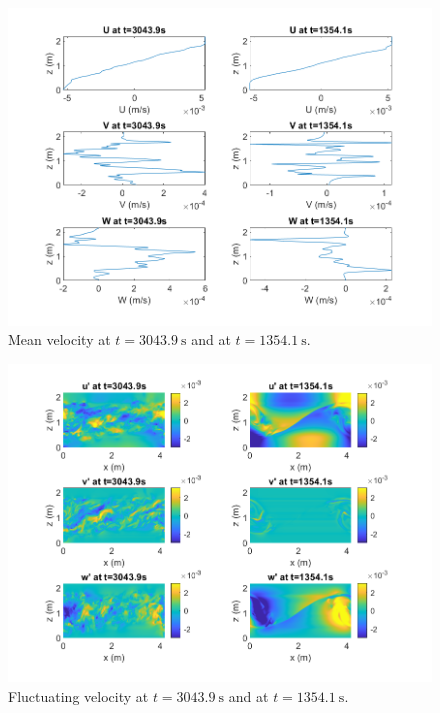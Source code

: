 \documentclass[11pt]{article}
\begin{document}
\begin{enumerate}
\begin{enumerate}
			\begin{figure}[htbp]
				\centering
				\includegraphics[width=\textwidth]{1-plots/Vel_avg_plot_3043_1354.png}
				\caption{Mean velocity at $t=\SI{3043.9}{\second}$ and at $t=\SI{1354.1}{\second}$.}
				\label{fig:Vel avg}
			\end{figure}
		
			\begin{figure}[htbp]
				\centering
				\includegraphics[width=\textwidth]{1-plots/Vel_primes_plot_3043_1354.png}
				\caption{Fluctuating velocity at $t=\SI{3043.9}{\second}$ and at $t=\SI{1354.1}{\second}$.}
				\label{fig:Vel prime}
			\end{figure}
			

\end{enumerate}
\end{enumerate}
\end{document}
